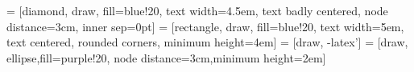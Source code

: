 
\newcommand\LensSph{} 				%
\def\LensSph[#1](#2,#3,#4,#5){%
	\pgfmathsetmacro\Tho{asin(0.5*#4/#5)}
	\filldraw[#1]  (#2- .5*#3,.5*#4) arc(-\Tho: \Tho: -#5)-- ++(-#2,0)-- ++(0,#4)--cycle;
}

 = [diamond, draw, fill=blue!20, text width=4.5em, text badly centered, node distance=3cm, inner sep=0pt]
 = [rectangle, draw, fill=blue!20, text width=5em, text centered, rounded corners, minimum height=4em]
 = [draw, -latex']
 = [draw, ellipse,fill=purple!20, node distance=3cm,minimum height=2em]

%

\usepackage{pgfplots}
\pgfplotsset{compat=1.8}

